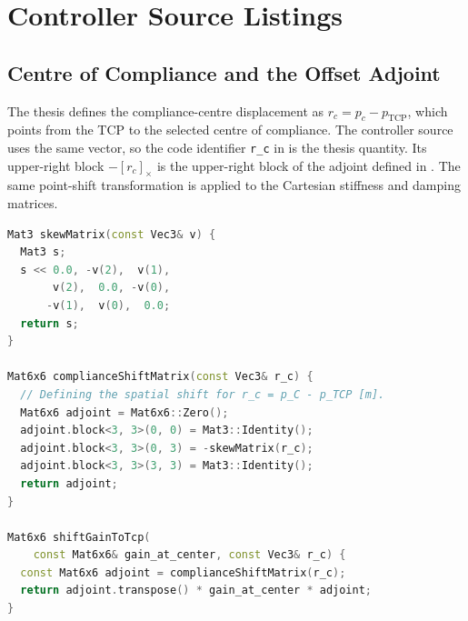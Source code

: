 \chapter{Controller Source Listings}
\label{app:code}




\section{Centre of Compliance and the Offset Adjoint}
\label{app:center_compliance}

The thesis defines the compliance-centre displacement as
\(r_c=p_c-p_{\mathrm{TCP}}\), which points from the TCP to the selected
centre of compliance. The controller source uses the same vector, so the code
identifier \texttt{r\_c} in
\mbox{} is the thesis
quantity. Its upper-right block \(-[r_c]_\times\) is the upper-right block of
the adjoint defined in \mbox{}. The same point-shift
transformation is applied to the Cartesian stiffness and damping matrices.

\begin{lstlisting}[style=cppstyle, language=C++, caption={Source-side compliance-centre adjoint and point-shift transform.}, label={lst:app_compliance_adjoint}]
Mat3 skewMatrix(const Vec3& v) {
  Mat3 s;
  s << 0.0, -v(2),  v(1),
       v(2),  0.0, -v(0),
      -v(1),  v(0),  0.0;
  return s;
}

Mat6x6 complianceShiftMatrix(const Vec3& r_c) {
  // Defining the spatial shift for r_c = p_C - p_TCP [m].
  Mat6x6 adjoint = Mat6x6::Zero();
  adjoint.block<3, 3>(0, 0) = Mat3::Identity();
  adjoint.block<3, 3>(0, 3) = -skewMatrix(r_c);
  adjoint.block<3, 3>(3, 3) = Mat3::Identity();
  return adjoint;
}

Mat6x6 shiftGainToTcp(
    const Mat6x6& gain_at_center, const Vec3& r_c) {
  const Mat6x6 adjoint = complianceShiftMatrix(r_c);
  return adjoint.transpose() * gain_at_center * adjoint;
}
\end{lstlisting}

